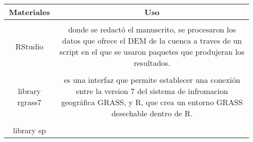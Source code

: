 \documentclass[11pt,]{article}
\begin{document}
\begin{longtable}[]{@{}cc@{}}
\toprule
\begin{minipage}[b]{0.07\columnwidth}\centering\strut
Materiales\strut
\end{minipage} & \begin{minipage}[b]{0.88\columnwidth}\centering\strut
Uso\strut
\end{minipage}\tabularnewline
\midrule
\endhead
\begin{minipage}[t]{0.07\columnwidth}\centering\strut
\strut
\end{minipage} & \begin{minipage}[t]{0.88\columnwidth}\centering\strut
\strut
\end{minipage}\tabularnewline
\begin{minipage}[t]{0.07\columnwidth}\centering\strut
RStudio\strut
\end{minipage} & \begin{minipage}[t]{0.88\columnwidth}\centering\strut
donde se redactó el manuscrito, se procesaron los datos que ofrece el
DEM de la cuenca a traves de un script en el que se usaron paquetes que
produjeran los resultados.\strut
\end{minipage}\tabularnewline
\begin{minipage}[t]{0.07\columnwidth}\centering\strut
\strut
\end{minipage} & \begin{minipage}[t]{0.88\columnwidth}\centering\strut
\strut
\end{minipage}\tabularnewline
\begin{minipage}[t]{0.07\columnwidth}\centering\strut
library rgrass7\strut
\end{minipage} & \begin{minipage}[t]{0.88\columnwidth}\centering\strut
es una interfaz que permite establecer una conexión entre la version 7
del sistema de infromacion geográfica GRASS, y R, que crea un entorno
GRASS desechable dentro de R.\strut
\end{minipage}\tabularnewline
\begin{minipage}[t]{0.07\columnwidth}\centering\strut
\strut
\end{minipage} & \begin{minipage}[t]{0.88\columnwidth}\centering\strut
\strut
\end{minipage}\tabularnewline
\begin{minipage}[t]{0.07\columnwidth}\centering\strut
library sp\strut
\end{minipage} & \begin{minipage}[t]{0.88\columnwidth}\centering\strut

\end{minipage}
\end{longtable}
\end{document}
